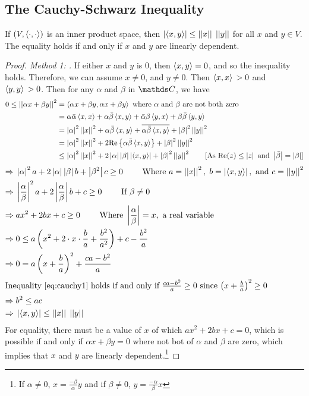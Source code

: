 \documentclass[../main-sheet.tex]{subfiles}
\begin{document}
\subsection{The Cauchy-Schwarz Inequality}
If $ \left( V,\left<\cdot,\cdot\right> \right) $ is an inner product space, then $ \left\vert\left<x,y\right>\right\vert\leq \left\vert\left\vert x\right\vert\right\vert\;\left\vert\left\vert y\right\vert\right\vert $ for all $ x $ and $ y \in V$. The equality holds if and only if $ x $ and $ y $ are linearly dependent.
\begin{proof}[Proof. Method 1: ]
    If either $ x $ and $ y $ is 0, then $ \left<x,y\right>=0 $, and so the inequality holds. Therefore, we can assume $ x\neq 0 $, and $ y\neq 0 $. Then $ \left<x,x\right>\,>0 $ and $ \left<y,y\right>\,>0 $. Then for any $ \alpha $ and $ \beta  $ in $ \C $, we have
    \begin{align*}
        0\leq \left\vert\left\vert\alpha x+\beta y\right\vert\right\vert^2&=\left<\alpha x+\beta y,\alpha x+\beta y\right>\text{ where $ \alpha $ and $ \beta $ are not both zero}\\
        &=\alpha \bar{\alpha}\left<x,x\right>+\alpha \bar{\beta} \left<x,y\right>+\bar{\alpha}\beta\left<y,x\right>+\beta\bar{\beta}\left<y,y\right>\\
        &=\left\vert\alpha\right\vert^2 \left\vert\left\vert x\right\vert\right\vert^2+\alpha \bar{\beta} \left<x,y\right>+\overline{\alpha \bar{\beta}\left<x,y\right>}+\left\vert\beta\right\vert^2\left\vert\left\vert y\right\vert\right\vert^2\\
        &=\left\vert\alpha\right\vert^2 \left\vert\left\vert x\right\vert\right\vert^2+2\text{Re}\left\{\alpha \bar{\beta} \left<x,y\right>\right\}+\left\vert\beta\right\vert^2\left\vert\left\vert y\right\vert\right\vert^2\\
        &\leq \left\vert\alpha\right\vert^2 \left\vert\left\vert x\right\vert\right\vert^2+2 \left\vert\alpha\right\vert \left\vert\beta\right\vert \left\vert\left<x,y\right>\right\vert+\left\vert\beta\right\vert^2\left\vert\left\vert y\right\vert\right\vert^2\qquad [\text{As } \text{Re}(z)\leq \left\vert z\right\vert \text{ and } \left\vert\bar{\beta}\right\vert=\left\vert\beta\right\vert]
    \end{align*}
    \begin{align}
        \Rightarrow\; &\left\vert\alpha\right\vert^2 a+2\left\vert\alpha\right\vert\left\vert\beta\right\vert b+\left\vert\beta^2\right\vert c \geq 0 \qquad \text{ Where } a=\left\vert\left\vert x\right\vert\right\vert^2,\;b=\left\vert\left<x,y\right>\right\vert,\text{ and } c=\left\vert\left\vert y\right\vert\right\vert^2\notag\\
        \Rightarrow\; &\left\vert\frac{\alpha}{\beta}\right\vert^2 a+2\left\vert\frac{\alpha}{\beta}\right\vert b+c \geq 0 \qquad\text{ If } \beta\neq 0\notag\\
        \Rightarrow\; &ax^2 +2bx+c \geq 0\qquad \text{ Where } \left\vert\frac{\alpha}{\beta}\right\vert=x, \text{ a real variable}\notag\\
        \Rightarrow\; &0 \leq a \left( x^2 +2\cdot x\cdot \frac{b}{a}+\frac{b^2}{a^2} \right)+c-\frac{b^2}{a}\notag\\
        \Rightarrow\; &0 = a \left( x+\frac{b}{a}\right)^2 + \frac{ca-b^2}{a}\label{eq:cauchy1}\\
        \intertext{Inequality \eqref{eq:cauchy1} holds if and only if $ \frac{ca-b^2}{a} \geq0$ since $ \left( x+\frac{b}{a} \right)^2\geq0 $}
        \Rightarrow\; & b^2\leq ac\notag\\
        \Rightarrow\; & \left\vert\left<x,y\right>\right\vert \leq \left\vert\left\vert x\right\vert\right\vert\;\left\vert\left\vert y\right\vert\right\vert\notag
    \end{align}
    For equality, there must be a value of $ x $ of which $ ax^2+2bx+c=0 $, which is possible if and only if $ \alpha x+\beta y=0  $ where not bot of $ \alpha $ and $ \beta $ are zero, which implies that $ x $ and $ y $ are linearly dependent.\footnote{If $ \alpha\neq 0 $, $ x=\frac{-\beta}{\alpha}y $ and if $ \beta\neq 0 $, $ y=\frac{-\alpha}{\beta}x $}
\end{proof}
\end{document}
